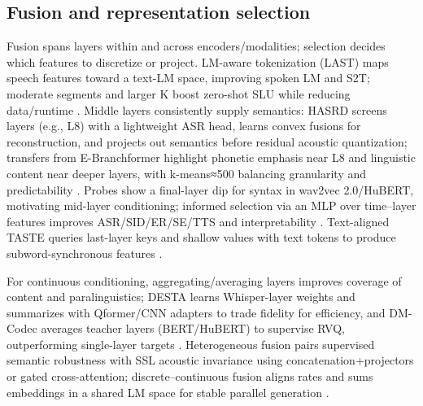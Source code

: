 \subsection{Fusion and representation selection} \label{subsec:Fusion and representation selection}
Fusion spans layers within and across encoders/modalities; selection decides which features to discretize or project. LM-aware tokenization (LAST) maps speech features toward a text-LM space, improving spoken LM and S2T; moderate segments and larger K boost zero-shot SLU while reducing data/runtime \cite{turetzky2024lastlanguagemodelawarespeechtokenization,kando2025exploringeffectsegmentationvocabularysiz}. Middle layers consistently supply semantics: HASRD screens layers (e.g., L8) with a lightweight ASR head, learns convex fusions for reconstruction, and projects out semantics before residual acoustic quantization; transfers from E-Branchformer highlight phonetic emphasis near L8 and linguistic content near deeper layers, with k-means≈500 balancing granularity and predictability \cite{hussein2025hasrdhierarchicalacousticsemanticreprese,chen2023reducingbarriersselfsupervisedlearninghu}. Probes show a final-layer dip for syntax in wav2vec 2.0/HuBERT, motivating mid-layer conditioning; informed selection via an MLP over time–layer features improves ASR/SID/ER/SE/TTS and interpretability \cite{shen2023wavesyntaxprobingspokenlanguagemodels,mousavi2024howshouldweextractdiscreteaudiotokenssel}. Text-aligned TASTE queries last-layer keys and shallow values with text tokens to produce subword-synchronous features \cite{tseng2025tastetextalignedspeechtokenizationembedd}.

For continuous conditioning, aggregating/averaging layers improves coverage of content and paralinguistics; DESTA learns Whisper-layer weights and summarizes with Qformer/CNN adapters to trade fidelity for efficiency, and DM-Codec averages teacher layers (BERT/HuBERT) to supervise RVQ, outperforming single-layer targets \cite{lu2024destaenhancingspeechlanguagemodelsthroug,ahasan2025dmcodecdistillingmultimodalrepresentatio}. Heterogeneous fusion pairs supervised semantic robustness with SSL acoustic invariance using concatenation+projectors or gated cross-attention; discrete–continuous fusion aligns rates and sums embeddings in a shared LM space for stable parallel generation \cite{mei2025shnumultilingualconversationalspeechreco,lin2025dkusystemmultispeakerautomaticspeechreco,tan2025drvoiceparallelspeechtextvoiceconversati}.


